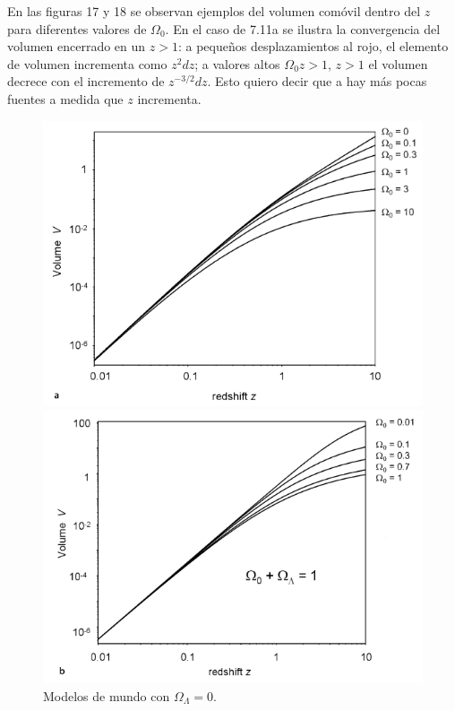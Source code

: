 \documentclass[11pt]{article}
\begin{document}
{\begin{itemize}
\begin{itemize}
\end{itemize} 
   
   \end{itemize} 
    
    En las figuras 17 y 18 se observan ejemplos del volumen comóvil dentro del $z$ para diferentes valores de $\Omega_0$. En el caso de 7.11a se ilustra la convergencia del volumen encerrado en un $z > 1$: a pequeños desplazamientos al rojo, el elemento de volumen incrementa como $z^2 dz$; a valores altos $\Omega_ 0 z > 1, \, z >1$ el volumen decrece con el incremento de $z^{-3/2} dz$. Esto quiero decir que a hay más pocas fuentes a medida que $z$ incrementa. 
    
    
    \begin{figure}[H]
        \begin{minipage}[b]{0.43\linewidth}
            \includegraphics[scale=0.37]{fig711a_Malcolm_pp240.png}
            \caption{\footnotesize{Modelos de mundo con $\Omega_{\Lambda}=0$.}}
    \end{minipage}
        \hspace{0.9cm}
    \begin{minipage}[b]{0.36\linewidth}
            \includegraphics[scale=0.37]{fig711b_Malcolm_pp240.png}
            

\end{minipage}
\end{figure}}
\end{document}
